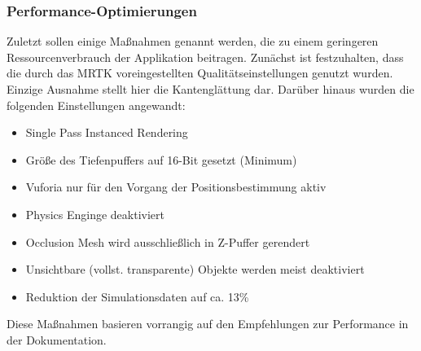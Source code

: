 \subsubsection{Performance-Optimierungen}
Zuletzt sollen einige Maßnahmen genannt werden, die zu einem geringeren Ressourcenverbrauch der Applikation beitragen. Zunächst ist festzuhalten, dass die durch das MRTK voreingestellten Qualitätseinstellungen genutzt wurden. Einzige Ausnahme stellt hier die Kantenglättung dar. Darüber hinaus wurden die folgenden Einstellungen angewandt:

\begin{itemize}
	\setlength{\itemsep}{-1pt}
	\singlespacing
	\item Single Pass Instanced Rendering
	\item Größe des Tiefenpuffers auf 16-Bit gesetzt (Minimum)
	\item Vuforia nur für den Vorgang der Positionsbestimmung aktiv
	\item Physics Enginge deaktiviert
	\item Occlusion Mesh wird ausschließlich in Z-Puffer gerendert
	\item Unsichtbare (vollst. transparente) Objekte werden meist deaktiviert
	\item Reduktion der Simulationsdaten auf ca. 13\%
\end{itemize}

Diese Maßnahmen basieren vorrangig auf den Empfehlungen zur Performance in der Dokumentation.